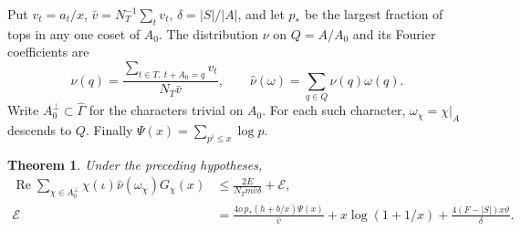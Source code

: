 \documentclass[11pt,letterpaper]{article}
\newcommand{\Rea}{\operatorname{Re}}
\newtheorem{theorem}{Theorem}[section]
\numberwithin{equation}{section}
\begin{document}
Put \(v_t=a_t/x\), \(\bar v=N_T^{-1}\sum_t v_t\), \(\delta=|S|/|A|\), and let \(p_*\) be the largest fraction of tops in any one coset of \(A_0\). The distribution \(\nu\) on \(Q=A/A_0\) and its Fourier coefficients are
\[
  \nu(q)=\frac{\sum_{t\in T,\ t+A_0=q}v_t}{N_T\bar v},\qquad
  \widehat\nu(\omega)=\sum_{q\in Q}\nu(q)\omega(q).
\]
Write \(A_0^\perp\subset\widehat\Gamma\) for the characters trivial on \(A_0\). For each such character, \(\omega_\chi=\chi|_A\) descends to \(Q\). Finally \(\Psi(x)=\sum_{p^i\le x}\log p\).

\begin{theorem}\label{th:average}
Under the preceding hypotheses,
\begin{align}
 \Rea\sum_{\chi\in A_0^\perp}\chi(\iota)\widehat\nu(\omega_\chi)G_\chi(x)
 &\le \frac{2E}{N_Tm\bar v\delta}+\mathcal E,                         \label{eq:main}\\
 \mathcal E&=\frac{4o\,p_*(h+b/x)\Psi(x)}{\bar v}
       +x\log(1+1/x)+\frac{4(F-|S|)x\vartheta}{\delta}.               \label{eq:cost}
\end{align}
\end{theorem}
\end{document}
